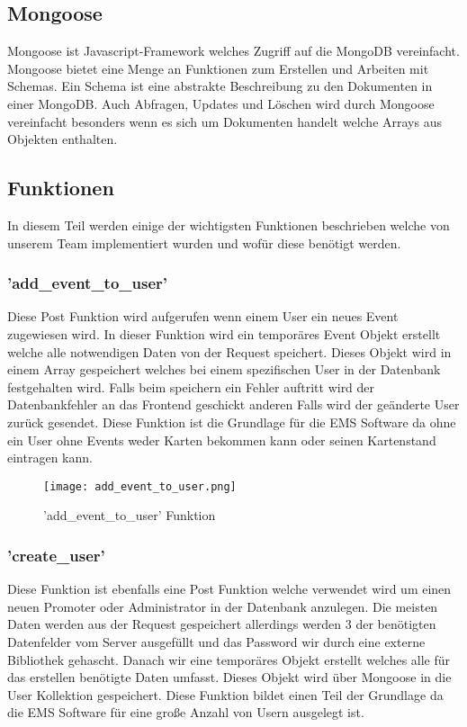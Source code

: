 		 	\subsection{Mongoose}
		 		Mongoose ist Javascript-Framework welches Zugriff auf die MongoDB vereinfacht. Mongoose bietet eine Menge an Funktionen zum Erstellen und Arbeiten mit Schemas. Ein Schema ist eine abstrakte Beschreibung zu den Dokumenten in einer MongoDB. Auch Abfragen, Updates und Löschen wird durch Mongoose vereinfacht besonders wenn es sich um Dokumenten handelt welche Arrays aus Objekten enthalten. 
		 	
			\subsection{Funktionen}
		 	In diesem Teil werden einige der wichtigsten Funktionen beschrieben welche von unserem Team implementiert wurden und wofür diese benötigt werden. 
		 	
		 	\subsubsection{'add\_event\_to\_user'}
		 		Diese Post Funktion wird aufgerufen wenn einem User ein neues Event zugewiesen wird. In dieser Funktion wird ein temporäres Event Objekt erstellt welche alle notwendigen Daten von der Request speichert. Dieses Objekt wird in einem Array gespeichert welches bei einem spezifischen User in der Datenbank festgehalten wird. Falls beim speichern ein Fehler auftritt wird der Datenbankfehler an das Frontend geschickt anderen Falls wird der geänderte User zurück gesendet. Diese Funktion ist die Grundlage für die EMS Software da ohne ein User ohne Events weder Karten bekommen kann oder seinen Kartenstand eintragen kann.
		 		
		 		\begin{figure}[h]
		 			\centering
		 			\texttt{[image: add\_event\_to\_user.png]}
		 			\caption{'add\_event\_to\_user' Funktion}
		 		\end{figure}
		 	
		 	\subsubsection{'create\_user'}
		 		Diese Funktion ist ebenfalls eine Post Funktion welche verwendet wird um einen neuen Promoter oder Administrator in der Datenbank anzulegen. Die meisten Daten werden aus der Request gespeichert allerdings werden 3 der benötigten Datenfelder vom Server ausgefüllt und das Password wir durch eine externe Bibliothek gehascht. Danach wir eine temporäres Objekt erstellt welches alle für das erstellen benötigte Daten umfasst. Dieses Objekt wird über Mongoose in die User Kollektion gespeichert. Diese Funktion bildet einen Teil der Grundlage da die EMS Software für eine große Anzahl von Usern ausgelegt ist. 
		 		
